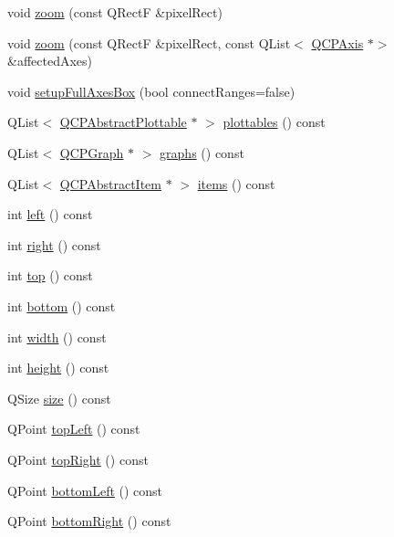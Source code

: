 \begin{DoxyCompactItemize}
\item 
void \hyperlink{classQCPAxisRect_a5fc8460564e81dcc2a9343dc8bc1fe67}{zoom} (const Q\+RectF \&pixel\+Rect)
\item 
void \hyperlink{classQCPAxisRect_a6a39fb3aea60a8c503bdcb3f0477d2f6}{zoom} (const Q\+RectF \&pixel\+Rect, const Q\+List$<$ \hyperlink{classQCPAxis}{Q\+C\+P\+Axis} $\ast$$>$ \&affected\+Axes)
\item 
void \hyperlink{classQCPAxisRect_a5fa906175447b14206954f77fc7f1ef4}{setup\+Full\+Axes\+Box} (bool connect\+Ranges=false)
\item 
Q\+List$<$ \hyperlink{classQCPAbstractPlottable}{Q\+C\+P\+Abstract\+Plottable} $\ast$ $>$ \hyperlink{classQCPAxisRect_a587d073a97b27bc7293fab4b2774ad59}{plottables} () const
\item 
Q\+List$<$ \hyperlink{classQCPGraph}{Q\+C\+P\+Graph} $\ast$ $>$ \hyperlink{classQCPAxisRect_a2d9ded3eca97be1fcb5867949391bb88}{graphs} () const
\item 
Q\+List$<$ \hyperlink{classQCPAbstractItem}{Q\+C\+P\+Abstract\+Item} $\ast$ $>$ \hyperlink{classQCPAxisRect_a03c113a2175448300ee8f944e24776ba}{items} () const
\item 
int \hyperlink{classQCPAxisRect_afb4a3de02046b20b9310bdb8fca781c3}{left} () const
\item 
int \hyperlink{classQCPAxisRect_a3f819d4a1b2193723d1fdafc573eea10}{right} () const
\item 
int \hyperlink{classQCPAxisRect_a45dbad181cbb9f09d068dbb76c817c95}{top} () const
\item 
int \hyperlink{classQCPAxisRect_acefdf1abaa8a8ab681e906cc2be9581e}{bottom} () const
\item 
int \hyperlink{classQCPAxisRect_a204645398a4f9d0b0189385c7c2cfb91}{width} () const
\item 
int \hyperlink{classQCPAxisRect_acc4377809e79d9a089ab790f39429b0d}{height} () const
\item 
Q\+Size \hyperlink{classQCPAxisRect_a7a8289346eb612f422c704f8b75cf479}{size} () const
\item 
Q\+Point \hyperlink{classQCPAxisRect_a5a847b3ddeca3abec38d3838fefb0dbd}{top\+Left} () const
\item 
Q\+Point \hyperlink{classQCPAxisRect_a7aa221967549ba71b98c465bf8234758}{top\+Right} () const
\item 
Q\+Point \hyperlink{classQCPAxisRect_ab15d4311d6535ccd7af504dc0e2b98c6}{bottom\+Left} () const
\item 
Q\+Point \hyperlink{classQCPAxisRect_a36dac884ec8fa3a3a2f3842ca7b7d32d}{bottom\+Right} () const
$$
\end{DoxyCompactItemize}
